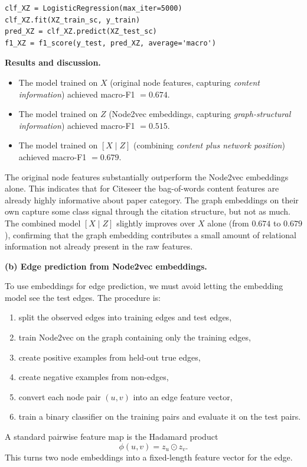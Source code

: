 \documentclass{article}
\begin{document}
\begin{tcolorbox}[colback=white, colframe=black!75, breakable, title=\textbf{Solution to Exercise 1}]
\begin{lstlisting}[style=python2]
clf_XZ = LogisticRegression(max_iter=5000)
clf_XZ.fit(XZ_train_sc, y_train)
pred_XZ = clf_XZ.predict(XZ_test_sc)
f1_XZ = f1_score(y_test, pred_XZ, average='macro')
\end{lstlisting}

\medskip
\textbf{Results and discussion.}
\begin{itemize}
    \item The model trained on $X$ (original node features, capturing \emph{content information}) achieved macro-F1 $= 0.674$.
    \item The model trained on $Z$ (Node2vec embeddings, capturing \emph{graph-structural information}) achieved macro-F1 $= 0.515$.
    \item The model trained on $[X\mid Z]$ (combining \emph{content plus network position}) achieved macro-F1 $= 0.679$.
\end{itemize}

The original node features substantially outperform the Node2vec embeddings alone. This indicates that for Citeseer the bag-of-words content features are already highly informative about paper category. The graph embeddings on their own capture some class signal through the citation structure, but not as much. The combined model $[X\mid Z]$ slightly improves over $X$ alone (from $0.674$ to $0.679$), confirming that the graph embedding contributes a small amount of relational information not already present in the raw features.

\bigskip
\textbf{(b) Edge prediction from Node2vec embeddings.}

To use embeddings for edge prediction, we must avoid letting the embedding model see the test edges. The procedure is:
\begin{enumerate}[$1.$]
    \item split the observed edges into training edges and test edges,
    \item train Node2vec on the graph containing only the training edges,
    \item create positive examples from held-out true edges,
    \item create negative examples from non-edges,
    \item convert each node pair $(u,v)$ into an edge feature vector,
    \item train a binary classifier on the training pairs and evaluate it on the test pairs.
\end{enumerate}

A standard pairwise feature map is the Hadamard product
\[
\phi(u,v)=z_u\odot z_v.
\]
This turns two node embeddings into a fixed-length feature vector for the edge.


\end{tcolorbox}
\end{document}

